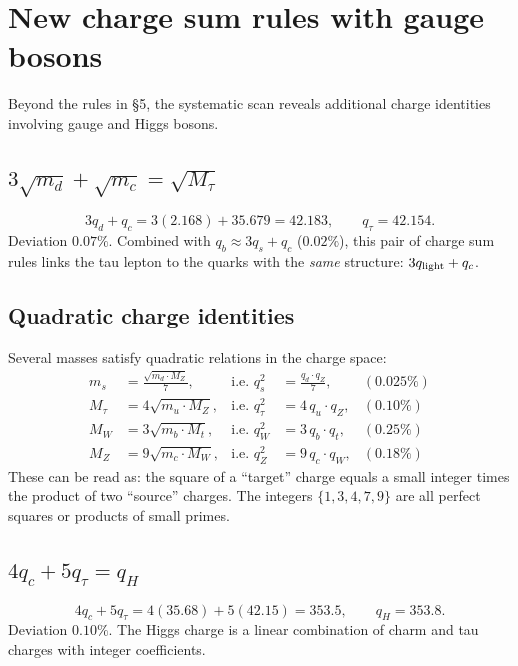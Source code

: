 \documentclass[11pt]{article}
\begin{document}
\section{New charge sum rules with gauge bosons}

Beyond the rules in \S5, the systematic scan reveals
additional charge identities involving gauge and Higgs bosons.

\subsection{$3\sqrt{m_d} + \sqrt{m_c} = \sqrt{M_\tau}$}

\begin{equation}
  3q_d + q_c = 3(2.168) + 35.679 = 42.183,
  \qquad
  q_\tau = 42.154.
\end{equation}
Deviation $0.07\%$.  Combined with
$q_b \approx 3q_s + q_c$ ($0.02\%$), this pair of
charge sum rules links the tau lepton to the quarks
with the \emph{same} structure: $3q_{\rm light} + q_c$.

\subsection{Quadratic charge identities}

Several masses satisfy quadratic relations in the charge
space:
\begin{align}
  m_s &= \frac{\sqrt{m_d\cdot M_Z}}{7},
  & \text{i.e.\ } q_s^2 &= \frac{q_d \cdot q_Z}{7},
  & (0.025\%) \label{eq:qs-qd-qZ} \\
  M_\tau &= 4\sqrt{m_u\cdot M_Z},
  & \text{i.e.\ } q_\tau^2 &= 4\,q_u \cdot q_Z,
  & (0.10\%) \\
  M_W &= 3\sqrt{m_b\cdot M_t},
  & \text{i.e.\ } q_W^2 &= 3\,q_b \cdot q_t,
  & (0.25\%) \\
  M_Z &= 9\sqrt{m_c\cdot M_W},
  & \text{i.e.\ } q_Z^2 &= 9\,q_c \cdot q_W,
  & (0.18\%)
\end{align}
These can be read as: the square of a ``target'' charge
equals a small integer times the product of two ``source''
charges.  The integers $\{1, 3, 4, 7, 9\}$ are all
perfect squares or products of small primes.

\subsection{$4q_c + 5q_\tau = q_H$}

\begin{equation}
  4q_c + 5q_\tau = 4(35.68) + 5(42.15) = 353.5,
  \qquad q_H = 353.8.
\end{equation}
Deviation $0.10\%$.  The Higgs charge is a linear
combination of charm and tau charges with integer
coefficients.
\end{document}
